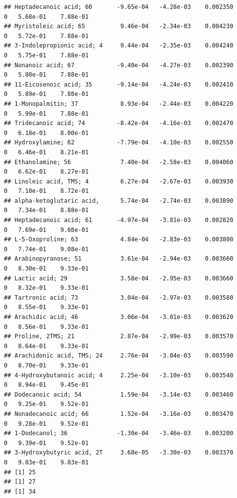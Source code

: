 \documentclass[]{article}
\begin{document}
\begin{verbatim}
## Heptadecanoic acid; 60       -9.65e-04   -4.28e-03    0.002350         0   5.68e-01    7.88e-01
## Myristoleic acid; 65          9.46e-04   -2.34e-03    0.004230         0   5.72e-01    7.88e-01
## 3-Indolepropionic acid; 4     9.44e-04   -2.35e-03    0.004240         0   5.75e-01    7.88e-01
## Nonanoic acid; 67            -9.40e-04   -4.27e-03    0.002390         0   5.80e-01    7.88e-01
## 11-Eicosenoic acid; 35       -9.14e-04   -4.24e-03    0.002410         0   5.89e-01    7.88e-01
## 1-Monopalmitin; 37            8.93e-04   -2.44e-03    0.004220         0   5.99e-01    7.88e-01
## Tridecanoic acid; 74         -8.42e-04   -4.16e-03    0.002470         0   6.18e-01    8.00e-01
## Hydroxylamine; 62            -7.79e-04   -4.10e-03    0.002550         0   6.46e-01    8.21e-01
## Ethanolamine; 56              7.40e-04   -2.58e-03    0.004060         0   6.62e-01    8.27e-01
## Linoleic acid, TMS; 4         6.27e-04   -2.67e-03    0.003930         0   7.10e-01    8.72e-01
## alpha-ketoglutaric acid,      5.74e-04   -2.74e-03    0.003890         0   7.34e-01    8.88e-01
## Heptadecanoic acid; 61       -4.97e-04   -3.81e-03    0.002820         0   7.69e-01    9.08e-01
## L-5-Oxoproline; 63            4.84e-04   -2.83e-03    0.003800         0   7.74e-01    9.08e-01
## Arabinopyranose; 51           3.61e-04   -2.94e-03    0.003660         0   8.30e-01    9.33e-01
## Lactic acid; 29               3.58e-04   -2.95e-03    0.003660         0   8.32e-01    9.33e-01
## Tartronic acid; 73            3.04e-04   -2.97e-03    0.003580         0   8.55e-01    9.33e-01
## Arachidic acid; 46            3.06e-04   -3.01e-03    0.003620         0   8.56e-01    9.33e-01
## Proline, 2TMS; 21             2.87e-04   -2.99e-03    0.003570         0   8.64e-01    9.33e-01
## Arachidonic acid, TMS; 24     2.76e-04   -3.04e-03    0.003590         0   8.70e-01    9.33e-01
## 4-Hydroxybutanoic acid; 4     2.25e-04   -3.10e-03    0.003540         0   8.94e-01    9.45e-01
## Dodecanoic acid; 54           1.59e-04   -3.14e-03    0.003460         0   9.25e-01    9.52e-01
## Nonadecanoic acid; 66         1.52e-04   -3.16e-03    0.003470         0   9.28e-01    9.52e-01
## 1-Dodecanol; 36              -1.30e-04   -3.46e-03    0.003200         0   9.39e-01    9.52e-01
## 3-Hydroxybutyric acid, 2T     3.68e-05   -3.30e-03    0.003370         0   9.83e-01    9.83e-01
## [1] 25
## [1] 27
## [1] 34
\end{verbatim}
\end{document}
